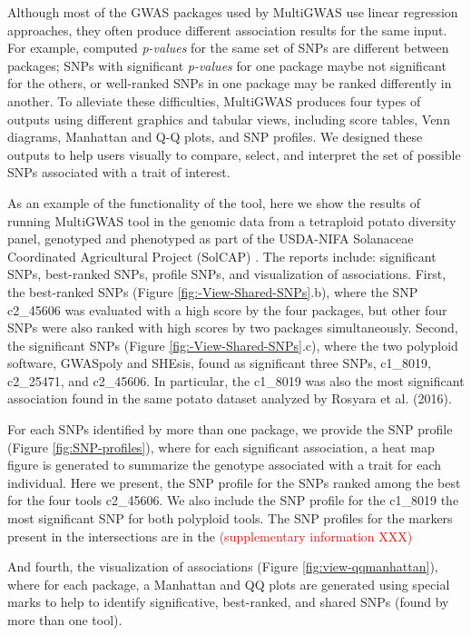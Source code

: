 \documentclass{article}
\begin{document}
Although most of the GWAS packages used by MultiGWAS use linear regression approaches, they often produce different association results for the same input. For example, computed \emph{p-values }for the same set of SNPs are different between packages; SNPs with significant \emph{p-values} for one package maybe not significant for the others, or well-ranked SNPs in one package may be ranked differently in another. To alleviate these difficulties, MultiGWAS produces four types of outputs using different graphics and tabular views, including score tables, Venn diagrams, Manhattan and Q-Q plots, and SNP profiles. We designed these outputs to help users visually to compare, select, and interpret the set of possible SNPs associated with a trait of interest. 

As an example of the functionality of the tool, here we show the results of running MultiGWAS tool in the genomic data from a tetraploid potato diversity panel, genotyped and phenotyped as part of the USDA-NIFA Solanaceae Coordinated Agricultural Project (SolCAP) \cite{Hirsch2013}. The reports include: significant SNPs, best-ranked SNPs, profile SNPs, and visualization of associations. First, the best-ranked SNPs (Figure \ref{fig:-View-Shared-SNPs}.b), where the SNP c2\_45606 was evaluated with a high score by the four packages, but other four SNPs were also ranked with high scores by two packages simultaneously. Second, the significant SNPs (Figure \ref{fig:-View-Shared-SNPs}.c), where the two polyploid software, GWASpoly and SHEsis, found as significant three SNPs, c1\_8019, c2\_25471, and c2\_45606. In particular, the c1\_8019 was also the most significant association found in the same potato dataset analyzed by Rosyara et al. (2016). 

For each SNPs identified by more than one package, we provide the SNP profile (Figure \ref{fig:SNP-profiles}), where for each significant association, a heat map figure is generated to summarize the genotype associated with a trait for each individual. Here we present, the SNP profile for the SNPs ranked among the best for the four tools c2\_45606. We also include the SNP profile for the  c1\_8019 the most significant SNP for both polyploid tools. The SNP profiles for the markers present in the intersections are in the \textcolor{red}{(supplementary information XXX)}


And fourth, the visualization of associations (Figure \ref{fig:view-qqmanhattan}), where for each package, a Manhattan and QQ plots are generated using special marks to help to identify significative, best-ranked, and shared SNPs (found by more than one tool). 
\end{document}
